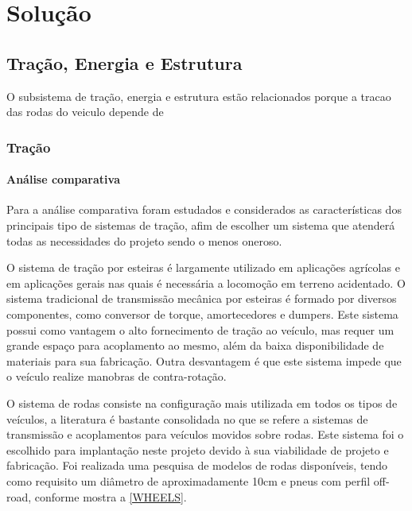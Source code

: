 \chapter{Solução}
  \section{Tração, Energia e Estrutura}
  
  O subsistema de tração, energia e estrutura estão relacionados porque a tracao das rodas do veiculo depende de 

  \subsection{Tração}
  
    \subsubsection{Análise comparativa}
    
    Para a análise comparativa foram estudados e considerados as características dos principais tipo de sistemas de tração, 
    afim de escolher um sistema que atenderá todas as necessidades do projeto sendo o menos oneroso.
  
      
      O sistema de tração por esteiras é largamente utilizado em aplicações agrícolas e em aplicações gerais nas quais é necessária 
      a locomoção em terreno acidentado. O sistema tradicional de transmissão mecânica por esteiras é formado por diversos componentes, 
      como conversor de torque, amortecedores e dumpers. 
    Este sistema possui como vantagem o alto fornecimento de tração ao veículo, mas requer um grande espaço para acoplamento ao mesmo, 
    além da baixa disponibilidade de materiais para sua fabricação. Outra desvantagem é que este sistema impede que o veículo realize 
    manobras de contra-rotação.
      
      
      O sistema de rodas consiste na configuração mais utilizada em todos os tipos de veículos, a literatura é bastante consolidada 
      no que se refere a sistemas de transmissão e acoplamentos para veículos movidos sobre rodas. Este sistema foi o escolhido para 
      implantação neste projeto devido à sua viabilidade de projeto e fabricação.
    Foi realizada uma pesquisa de modelos de rodas disponíveis, tendo como requisito um diâmetro de aproximadamente 10cm e pneus com 
    perfil off-road, conforme mostra a \ref{WHEELS}.
      
